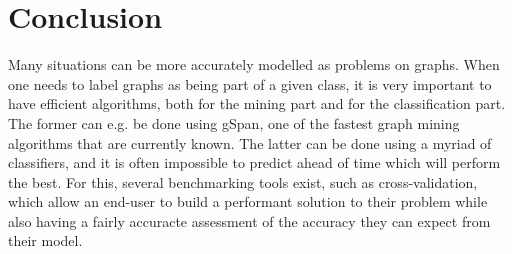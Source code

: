 \documentclass{sigkddExp}
\newcommand{\gspan}{\textsf{gSpan}}
\begin{document}
\section{Conclusion}
Many situations can be more accurately modelled as problems on graphs.
When one needs to label graphs as being part of a given class, it is very important to have efficient algorithms, both for the mining part and for the classification part.
The former can e.g. be done using \gspan, one of the fastest graph mining algorithms that are currently known.
The latter can be done using a myriad of classifiers, and it is often impossible to predict ahead of time which will perform the best.
For this, several benchmarking tools exist, such as cross-validation, which allow an end-user to build a performant solution to their problem while also having a fairly accuracte assessment of the accuracy they can expect from their model.

\printbibliography
\end{document}

